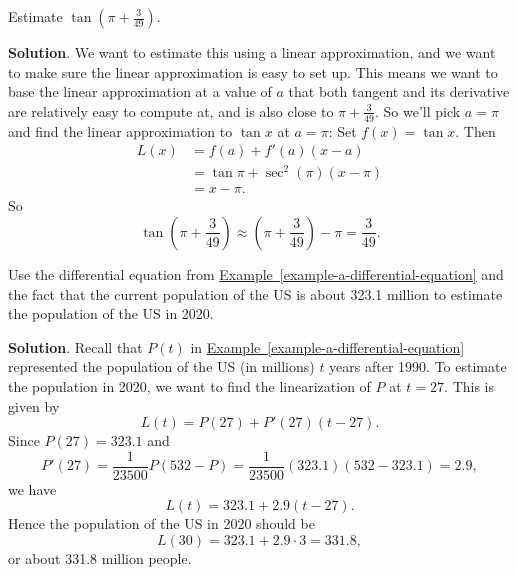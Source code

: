 \documentclass[10pt,]{book}
\theoremstyle{ptxplainnotitle}
\theoremstyle{ptxplaintitle}
\theoremstyle{ptxplainnotitle}
\theoremstyle{ptxplaintitle}
\theoremstyle{ptxplainnotitle}
\theoremstyle{ptxplaintitle}
\theoremstyle{ptxdefinitionnotitle}
\theoremstyle{ptxdefinitiontitle}
\theoremstyle{ptxdefinitionnotitle}
\theoremstyle{ptxdefinitiontitle}
\theoremstyle{ptxdefinitionnotitle}
\theoremstyle{ptxdefinitiontitle}
\theoremstyle{ptxdefinitionnotitle}
\theoremstyle{ptxdefinitiontitle}
\theoremstyle{ptxdefinitionnotitle}
\theoremstyle{ptxdefinitiontitle}
\numberwithin{equation}{section}
\begin{document}
\begin{example}\label{example-estimating-a-tangent}
\hypertarget{p-181}{}%
Estimate \(\tan(\pi+\frac{3}{49})\).%
\par\smallskip%
\noindent\textbf{Solution}.\hypertarget{solution-40}{}\quad%
\hypertarget{p-182}{}%
We want to estimate this using a linear approximation, and we want to make sure the linear approximation is easy to set up. This means we want to base the linear approximation at a value of \(a\) that both tangent and its derivative are relatively easy to compute at, and is also close to \(\pi+\frac{3}{49}\). So we'll pick \(a=\pi\) and find the linear approximation to \(\tan x\) at \(a = \pi\): Set \(f(x) = \tan x\). Then%
\begin{align*}
L(x) & = f(a) + f'(a)(x-a)\\
& = \tan\pi + \sec^{2}(\pi)(x-\pi) \\
& = x-\pi. 
\end{align*}
So%
\begin{equation*}
\tan(\pi+\frac{3}{49}) \approx (\pi+\frac{3}{49}) - \pi = \frac{3}{49}.
\end{equation*}
%
\end{example}
\begin{example}\label{example-estimating-the-population-of-the-united-states-in-2020}
\hypertarget{p-183}{}%
Use the differential equation from \hyperref[example-a-differential-equation]{Example~\ref{example-a-differential-equation}} and the fact that the current population of the US is about 323.1 million to estimate the population of the US in 2020.%
\par\smallskip%
\noindent\textbf{Solution}.\hypertarget{solution-41}{}\quad%
\hypertarget{p-184}{}%
Recall that \(P(t)\) in \hyperref[example-a-differential-equation]{Example~\ref{example-a-differential-equation}} represented the population of the US (in millions) \(t\) years after 1990. To estimate the population in 2020, we want to find the linearization of \(P\) at \(t = 27\). This is given by%
\begin{equation*}
L(t) = P(27) + P'(27)(t - 27).
\end{equation*}
Since \(P(27) = 323.1\) and%
\begin{equation*}
P'(27) = \frac{1}{23500}P(532-P) = \frac{1}{23500}(323.1)(532-323.1) = 2.9,
\end{equation*}
we have%
\begin{equation*}
L(t) = 323.1 + 2.9(t-27).
\end{equation*}
Hence the population of the US in 2020 should be%
\begin{equation*}
L(30) = 323.1 + 2.9\cdot3 = 331.8,
\end{equation*}
or about 331.8 million people.%
\end{example}
\typeout{************************************************}
\typeout{************************************************}
\end{document}
